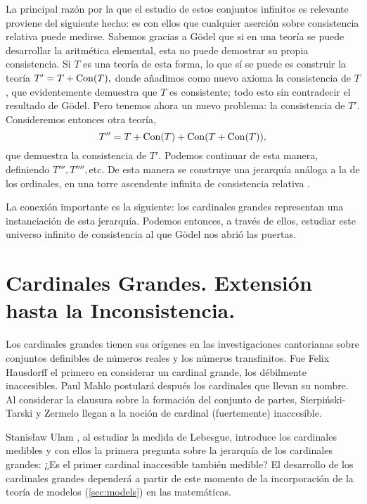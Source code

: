La principal razón por la que el estudio de estos conjuntos infinitos
es relevante proviene del siguiente hecho:
es con ellos que cualquier aserción sobre consistencia relativa
puede medirse.
Sabemos gracias a Gödel que si en una teoría se puede desarrollar la aritmética
elemental, esta no puede demostrar su propia consistencia.
Si $T$ es una teoría de esta forma, lo que sí se puede es construir la teoría
$T'=T+\operatorname{Con} ( T ),$
donde añadimos como nuevo axioma la consistencia
de $T$,
que evidentemente demuestra que $T$ es consistente; todo esto sin contradecir
el resultado de Gödel. Pero tenemos ahora un nuevo problema: la consistencia
de $T'$.
Consideremos entonces otra teoría,
\[T'' = T + \operatorname{Con} ( T ) + \operatorname{Con} ( T + \operatorname{Con} ( T ) ),\]
que demuestra la consistencia de $T'$.
Podemos continuar de esta manera, definiendo $T''', T'''',\text{etc}$.
De esta manera se construye una jerarquía análoga a la de los ordinales,
en una torre ascendente infinita de consistencia relativa
\autocite[\S 7.7]{hamkins_lectures_2020}.

La conexión importante es la siguiente:
los cardinales grandes representan una instanciación de esta jerarquía.
Podemos entonces, a través de ellos, estudiar este universo infinito de
consistencia al que Gödel nos abrió las puertas.

\section*{Cardinales Grandes. Extensión hasta la Inconsistencia.}

Los cardinales grandes tienen sus orígenes en las investigaciones cantorianas
sobre conjuntos definibles de números reales y los números transfinitos.
Fue Felix Hausdorff \autocite{hausdorff_grundzuge_nodate}
el primero en considerar un cardinal grande,
los débilmente inaccesibles.
Paul Mahlo \autocite{mahlo_uber_1911,mahlo_zur_1912,mahlo_zur_1913}
postulará después los cardinales que llevan su nombre.
Al considerar la clausura sobre la formación del conjunto de partes,
Sierpiński-Tarski \autocite{sierpinski_sur_1930} y  Zermelo \autocite{zermelo_uber_1930}
llegan a la noción de cardinal (fuertemente) inaccesible.

Stanisław Ulam \autocite{ulam_zur_1930}, al estudiar la medida de Lebesgue,
introduce los cardinales medibles y con ellos la primera
pregunta sobre la jerarquía de los cardinales grandes:
¿Es el primer cardinal inaccesible también medible?
El desarrollo de los cardinales grandes dependerá a partir de este
momento de la incorporación de la teoría de modelos (\cref{sec:models}) en las matemáticas.

